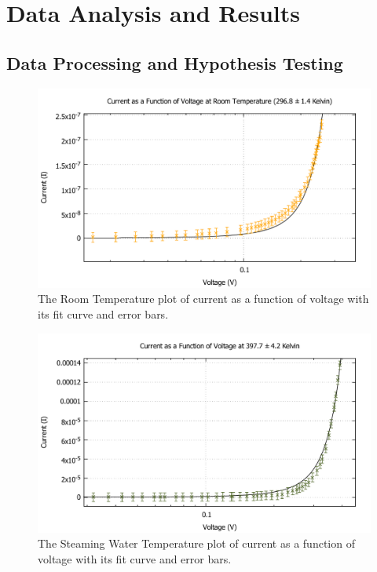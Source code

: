\documentclass[11pt,letterpaper,onecolumn]{article}
\begin{document}

\section{Data Analysis and Results}

\subsection{Data Processing and Hypothesis Testing}
\begin{figure}[H]
\centering
\includegraphics[scale =.5]{RoomTemp1.pdf}
\caption{The Room Temperature plot of current as a function of voltage with its fit curve and error bars.\label{fig:rmtmp}}

\end{figure}
\begin{figure}[H]
\centering
\includegraphics[scale =.5]{HotTemp1.pdf}
\caption{The Steaming Water Temperature plot of current as a function of voltage with its fit curve and error bars.\label{fig:htmp}}

\end{figure}
\end{document}
